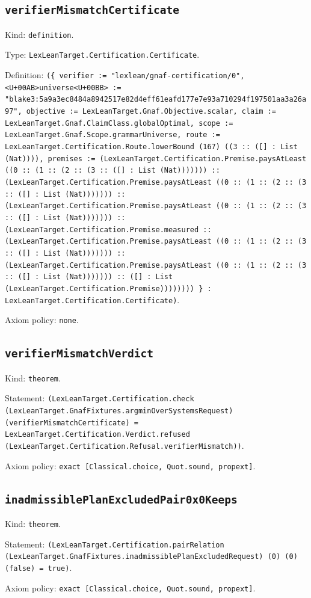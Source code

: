 \documentclass[11pt]{article}
\begin{document}
\subsection*{\texttt{verifierMismatchCertificate}}
\noindent Kind: \texttt{definition}.\par
\noindent Type: \texttt{LexLeanTarget.Certification.Certificate}.\par
\noindent Definition: \texttt{(\{ verifier := "lexlean/gnaf-certification/0", <U+00AB>universe<U+00BB> := "blake3:5a9a3ec8484a8942517e82d4eff61eafd177e7e93a710294f197501aa3a26a97", objective := LexLeanTarget.Gnaf.Objective.scalar, claim := LexLeanTarget.Gnaf.ClaimClass.globalOptimal, scope := LexLeanTarget.Gnaf.Scope.grammarUniverse, route := LexLeanTarget.Certification.Route.lowerBound (167) ((3 :: ([] : List (Nat)))), premises := (LexLeanTarget.Certification.Premise.paysAtLeast ((0 :: (1 :: (2 :: (3 :: ([] : List (Nat))))))) :: (LexLeanTarget.Certification.Premise.paysAtLeast ((0 :: (1 :: (2 :: (3 :: ([] : List (Nat))))))) :: (LexLeanTarget.Certification.Premise.paysAtLeast ((0 :: (1 :: (2 :: (3 :: ([] : List (Nat))))))) :: (LexLeanTarget.Certification.Premise.measured :: (LexLeanTarget.Certification.Premise.paysAtLeast ((0 :: (1 :: (2 :: (3 :: ([] : List (Nat))))))) :: (LexLeanTarget.Certification.Premise.paysAtLeast ((0 :: (1 :: (2 :: (3 :: ([] : List (Nat))))))) :: ([] : List (LexLeanTarget.Certification.Premise)))))))) \} : LexLeanTarget.Certification.Certificate)}.\par
\noindent Axiom policy: \texttt{none}.\par
\subsection*{\texttt{verifierMismatchVerdict}}
\noindent Kind: \texttt{theorem}.\par
\noindent Statement: \texttt{(LexLeanTarget.Certification.check (LexLeanTarget.GnafFixtures.argminOverSystemsRequest) (verifierMismatchCertificate) = LexLeanTarget.Certification.Verdict.refused (LexLeanTarget.Certification.Refusal.verifierMismatch))}.\par
\noindent Axiom policy: \texttt{exact [Classical.choice, Quot.sound, propext]}.\par
\subsection*{\texttt{inadmissiblePlanExcludedPair0x0Keeps}}
\noindent Kind: \texttt{theorem}.\par
\noindent Statement: \texttt{(LexLeanTarget.Certification.pairRelation (LexLeanTarget.GnafFixtures.inadmissiblePlanExcludedRequest) (0) (0) (false) = true)}.\par
\noindent Axiom policy: \texttt{exact [Classical.choice, Quot.sound, propext]}.\par
\end{document}
